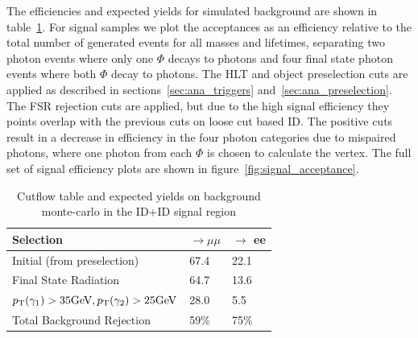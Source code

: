 The efficiencies and expected yields for simulated background are shown in table~\ref{tab:cuts_bkg}. For signal samples we plot the acceptances as an efficiency relative to the total number of generated events for all masses and lifetimes, separating two photon events where only one $\Phi$ decays to photons and four final state photon events where both $\Phi$ decay to photons. The HLT and object preselection cuts are applied as described in sections~\ref{sec:ana_triggers} and~\ref{sec:ana_preselection}. The FSR rejection cuts are applied, but due to the high signal efficiency they points overlap with the previous cuts on loose cut based ID. The positive \lxy cuts result in a decrease in efficiency in the four photon categories due to mispaired photons, where one photon from each $\Phi$ is chosen to calculate the vertex. The full set of signal efficiency plots are shown in figure~\ref{fig:signal_acceptance}.

\begin{table}[htb!]
	\begin{center}
		\caption[Cutflow table and expected yields on background monte-carlo in the ID+ID signal region]{Cutflow table and expected yields on background monte-carlo in the ID+ID signal region}
		\label{tab:cuts_bkg}
		\begin{tabular}{l|l|l}
			\hline
			Selection & \VZ $\rightarrow \mu \mu$  & \VZ $\rightarrow$ ee\\
			\hline
			Initial (from preselection) & 67.4 & 22.1 \\
			\hline
			Final State Radiation & 64.7 & 13.6\\
			\hline
			$p_\mathrm{T}(\gamma_1)>35 \text{GeV}, p_\mathrm{T}(\gamma_2)>25 \text{GeV}$ & 28.0 & 5.5 \\
			\hline
			\hline
			Total Background Rejection & 59\% & 75\%\\
			\hline
		\end{tabular}
	\end{center}
\end{table}

